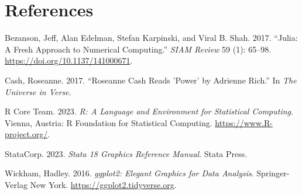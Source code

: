 \documentclass[
  letterpaper,
  DIV=11,
  numbers=noendperiod]{scrreprt}
\newlength{\cslhangindent}
\newenvironment{CSLReferences}[2] %
 {\begin{list}{}{%
  \setlength{\itemindent}{0pt}
  \setlength{\leftmargin}{0pt}
  \setlength{\parsep}{0pt}
  \ifodd #1
   \setlength{\leftmargin}{\cslhangindent}
   \setlength{\itemindent}{-1\cslhangindent}
  \fi
  \setlength{\itemsep}{#2\baselineskip}}}
 {\end{list}}
\begin{document}
\chapter*{References}\label{references}


\label{refs}
\begin{CSLReferences}{1}{0}
Bezanson, Jeff, Alan Edelman, Stefan Karpinski, and Viral B. Shah. 2017.
{``Julia: A Fresh Approach to Numerical Computing.''} \emph{SIAM Review}
59 (1): 65--98. \url{https://doi.org/10.1137/141000671}.

Cash, Roseanne. 2017. {``Roseanne Cash Reads 'Power' by Adrienne
Rich.''} In \emph{The Universe in Verse}.

R Core Team. 2023. \emph{R: A Language and Environment for Statistical
Computing}. Vienna, Austria: R Foundation for Statistical Computing.
\url{https://www.R-project.org/}.

StataCorp. 2023. \emph{Stata 18 Graphics Reference Manual}. Stata Press.

Wickham, Hadley. 2016. \emph{{ggplot2}: Elegant Graphics for Data
Analysis}. Springer-Verlag New York.
\url{https://ggplot2.tidyverse.org}.

\end{CSLReferences}
\end{document}
